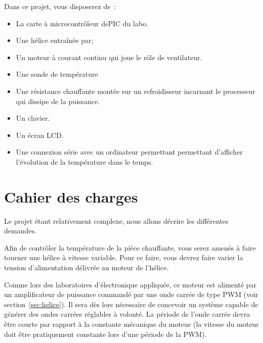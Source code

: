 \documentclass[11pt,a4paper]{article}
\theoremstyle{definition}%
\begin{document}
Dans ce projet, vous disposerez de~:
\begin{itemize}
	\item La carte à microcontrôleur dsPIC du labo.
	\item Une hélice entraînée par;
	\item Un moteur à courant continu qui joue le rôle de ventilateur.
	\item Une sonde de température
	\item Une résistance chauffante montée sur un refroidisseur incarnant le processeur qui dissipe de la puissance.
	\item Un clavier.
	\item Un écran LCD.
	\item Une connexion série avec un ordinateur permettant permettant d'afficher l'évolution de la température dans le temps.
\end{itemize}







\section{Cahier des charges}
Le projet étant relativement complexe, nous allons décrire les différentes demandes.

Afin de contrôler la température de la pièce chauffante, vous serez amenés à faire tourner une hélice
à vitesse variable.
Pour ce faire, vous devrez faire varier la tension d’alimentation délivrée au moteur de l’hélice.

Comme lors des laboratoires d’électronique appliquée, ce moteur est alimenté par un amplificateur de puissance commandé par une onde carrée de type PWM (voir section~\ref{sec:helice}).
Il sera dès lors nécessaire de concevoir un système capable de générer des ondes carrées réglables à volonté.
La période de l’onde carrée devra être courte par rapport à la constante mécanique du moteur (la vitesse du moteur doit être pratiquement constante lors d’une période de la PWM).
\end{document}

